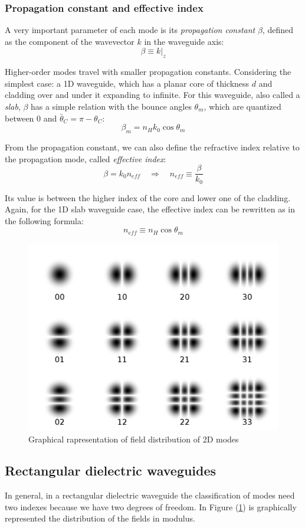 \documentclass[12pt,a4paper,twoside]{article}
\begin{document}
\subsubsection*{Propagation constant and effective index}

A very important parameter of each mode is its \textit{propagation constant} $\beta$, defined as the component of the wavevector $k$ in the waveguide axis:
\begin{equation}
\beta \equiv k|_z
\end{equation}

Higher-order modes travel with smaller propagation constants.
Considering the simplest case: a 1D waveguide, which has a planar core of thickness $d$ and cladding over and under it expanding to infinite.
For this waveguide, also called a \textit{slab}, $\beta$ has a simple relation with the bounce angles $\theta_m$, which are quantized between $0$ and $\bar{\theta}_C = \pi - \theta_C$:
$$\beta_m = n_H k_0 \cos \theta_m$$

From the propagation constant, we can also define the refractive index relative to the propagation mode, called \textit{effective index}:
\begin{equation}
\beta = k_0 n_{eff} \quad \Rightarrow \quad n_{eff} \equiv \frac{\beta}{k_0}
\end{equation}

Its value is between the higher index of the core and lower one of the cladding.
Again, for the 1D slab waveguide case, the effective index can be rewritten as in the following formula:
$$ n_{eff} \equiv n_H \cos \theta_m$$

\begin{figure}[!hb]
	\centering
	\includegraphics[width=.45\textwidth]{2Dmodes.png}
	\caption{Graphical rapresentation of field distribution of 2D modes}
	\label{fig_2dmodes}
\end{figure}

\subsection{Rectangular dielectric waveguides}
In general, in a rectangular dielectric waveguide the classification of modes need two indexes because we have two degrees of freedom.
In Figure (\ref{fig_2dmodes}) is graphically represented the distribution of the fields in modulus.
\end{document}
